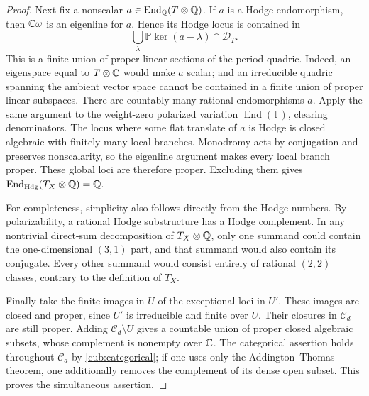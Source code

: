 \begin{proof}
Next fix a nonscalar $a\in\operatorname{End}_{\mathbb Q}(T\otimes\mathbb Q)$.
If $a$ is a Hodge endomorphism, then $\mathbb C\omega$ is an eigenline for
$a$.  Hence its Hodge locus is contained in
\[
 \bigcup_{\lambda}\mathbb P\ker(a-\lambda)\cap\mathcal D_T.
\]
This is a finite union of proper linear sections of the period quadric.
Indeed, an eigenspace equal to $T\otimes\mathbb C$ would make $a$ scalar;
and an irreducible quadric spanning the ambient vector space cannot
be contained in a finite union of proper linear subspaces.
There are countably many rational endomorphisms $a$. Apply the same
argument to the weight-zero polarized variation
$\operatorname{End}(\mathbb T)$, clearing denominators. The locus where
some flat translate of $a$ is Hodge is closed algebraic with finitely
many local branches. Monodromy acts by conjugation and preserves
nonscalarity, so the eigenline argument makes every local branch
proper. These global loci are therefore proper. Excluding them gives
$\operatorname{End}_{\mathrm{Hdg}}(T_X\otimes\mathbb Q)=\mathbb Q$.

For completeness, simplicity also follows directly from the Hodge
numbers.  By polarizability, a rational Hodge substructure has a Hodge
complement.  In any nontrivial direct-sum decomposition of $T_X\otimes\mathbb Q$,
only one summand could contain the one-dimensional $(3,1)$ part, and
that summand would also contain its conjugate.  Every other summand
would consist entirely of rational $(2,2)$ classes, contrary to the
definition of $T_X$.

Finally take the finite images in $U$ of the exceptional loci in $U'$.
These images are closed and proper, since $U'$ is irreducible and
finite over $U$. Their closures in $\mathcal C_d$ are still proper.
Adding $\mathcal C_d\setminus U$ gives a countable union of proper
closed algebraic subsets, whose complement is nonempty over $\mathbb C$.
The categorical
assertion holds throughout $\mathcal C_d$ by
\eqref{cub:categorical}; if one uses only the Addington--Thomas theorem,
one additionally removes the complement of its dense open subset.
This proves the simultaneous assertion.
\end{proof}

